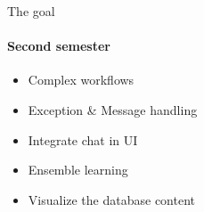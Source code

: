 \begin{frame}{The goal}
\framesubtitle{Second semester}
	\begin{itemize}
		\item Complex workflows
		\item Exception \& Message handling
		\item Integrate chat in UI
		\item Ensemble learning
		\item Visualize the database content
	\end{itemize}
\end{frame}